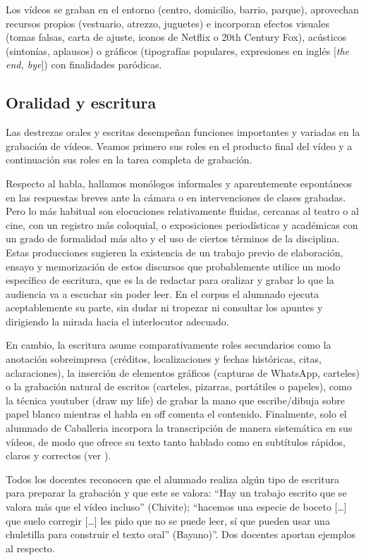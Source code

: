 \documentclass[spanish]{textolivre}
\begin{document}
Los vídeos se graban en el entorno (centro, domicilio, barrio, parque), aprovechan recursos propios (vestuario, atrezzo, juguetes) e incorporan efectos visuales (tomas falsas, carta de ajuste, iconos de Netflix o 20th Century Fox), acústicos (sintonías, aplausos) o gráficos (tipografías populares, expresiones en inglés [\textit{the end, bye}]) con finalidades paródicas.


\subsection{Oralidad y escritura}\label{sec-resumo}
Las destrezas orales y escritas desempeñan funciones importantes y variadas en la grabación de vídeos. Veamos primero sus roles en el producto final del vídeo y a continuación sus roles en la tarea completa de grabación.

Respecto al habla, hallamos monólogos informales y aparentemente espontáneos en las respuestas breves ante la cámara o en intervenciones de clases grabadas. Pero lo más habitual son elocuciones relativamente fluidas, cercanas al teatro o al cine, con un registro más coloquial, o exposiciones periodísticas y académicas con un grado de formalidad más alto y el uso de ciertos términos de la disciplina. Estas producciones sugieren la existencia de un trabajo previo de elaboración, ensayo y memorización de estos discursos que probablemente utilice un modo específico de escritura, que es la de redactar para oralizar y grabar lo que la audiencia va a escuchar sin poder leer. En el corpus el alumnado ejecuta aceptablemente su parte, sin dudar ni tropezar ni consultar los apuntes y dirigiendo la mirada hacia el interlocutor adecuado.

En cambio, la escritura asume comparativamente roles secundarios como la anotación sobreimpresa (créditos, localizaciones y fechas históricas, citas, aclaraciones), la inserción de elementos gráficos (capturas de WhatsApp, carteles) o la grabación natural de escritos (carteles, pizarras, portátiles o papeles), como la técnica youtuber (draw my life) de grabar la mano que escribe/dibuja sobre papel blanco mientras el habla en off comenta el contenido. Finalmente, solo el alumnado de Caballeria incorpora la transcripción de manera sistemática en sus vídeos, de modo que ofrece su texto tanto hablado como en subtítulos rápidos, claros y correctos (ver ).

Todos los docentes reconocen que el alumnado realiza algún tipo de escritura para preparar la grabación y que este se valora: “Hay un trabajo escrito que se valora más que el vídeo incluso” (Chivite); “hacemos una especie de boceto […] que suelo corregir […] les pido que no se puede leer, sí que pueden usar una chuletilla para construir el texto oral” (Bayano)”. Dos docentes aportan ejemplos al respecto.
\end{document}

